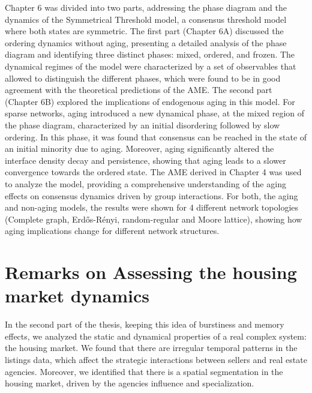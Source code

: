 Chapter 6 was divided into two parts, addressing the phase diagram and the dynamics of the Symmetrical Threshold model, a consensus threshold model where both states are symmetric. The first part (Chapter 6A) discussed the ordering dynamics without aging, presenting a detailed analysis of the phase diagram and identifying three distinct phases: mixed, ordered, and frozen. The dynamical regimes of the model were characterized by a set of observables that allowed to distinguish the different phases, which were found to be in good agreement with the theoretical predictions of the AME. The second part (Chapter 6B) explored the implications of endogenous aging in this model. For sparse networks, aging introduced a new dynamical phase, at the mixed region of the phase diagram, characterized by an initial disordering followed by slow ordering. In this phase, it was found that consensus can be reached in the state of an initial minority due to aging. Moreover, aging significantly altered the interface density decay and persistence, showing that aging leads to a slower convergence towards the ordered state. The AME derived in Chapter 4 was used to analyze the model, providing a comprehensive understanding of the aging effects on consensus dynamics driven by group interactions. For both, the aging and non-aging models, the results were shown for 4 different network topologies (Complete graph, Erd\H{o}s-Rényi, random-regular and Moore lattice), showing how aging implications change for different network structures.

\section{Remarks on Assessing the housing market dynamics \label{sec:housing_market_dynamics}}

In the second part of the thesis, keeping this idea of burstiness and memory effects, we analyzed the static and dynamical properties of a real complex system: the housing market. We found that there are irregular temporal patterns in the listings data, which affect the strategic interactions between sellers and real estate agencies. Moreover, we identified that there is a spatial segmentation in the housing market, driven by the agencies influence and specialization.

